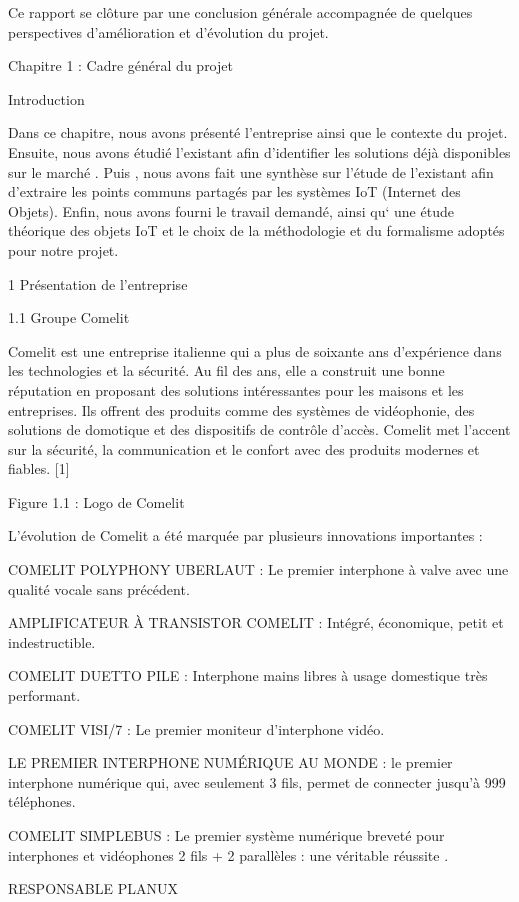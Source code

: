 \documentclass{article}
\begin{document}
Ce rapport se clôture par une conclusion générale accompagnée de quelques perspectives d’amélioration et d’évolution du projet.

Chapitre 1 : Cadre général du projet

Introduction 

Dans ce chapitre, nous avons présenté l'entreprise ainsi que le contexte du projet. Ensuite, nous avons étudié l'existant afin d'identifier les solutions déjà disponibles sur le marché . Puis , nous avons fait une synthèse  sur l’étude de l’existant afin d’extraire les  points  communs  partagés par les systèmes IoT (Internet des Objets). Enfin, nous avons fourni le travail demandé, ainsi qu‘ une  étude théorique des objets IoT et le choix de la méthodologie et du formalisme adoptés pour  notre projet.

1 Présentation de l’entreprise

1.1 Groupe Comelit

Comelit est une entreprise  italienne qui a plus de soixante ans d'expérience dans les technologies et la sécurité. Au fil des ans, elle a construit une bonne réputation en proposant des solutions intéressantes pour les maisons et les entreprises. Ils offrent des produits comme des systèmes de vidéophonie, des solutions de domotique et des dispositifs de contrôle d'accès. Comelit met l'accent sur la sécurité, la communication et le confort avec des produits modernes et fiables. [1]

Figure 1.1 : Logo de Comelit

L’évolution de Comelit a été marquée par plusieurs innovations importantes :

COMELIT POLYPHONY UBERLAUT : Le premier interphone à valve avec une qualité vocale sans précédent. 

AMPLIFICATEUR À TRANSISTOR COMELIT : Intégré, économique, petit et indestructible. 

COMELIT DUETTO PILE : Interphone mains libres à usage domestique très performant. 

COMELIT VISI/7 : Le premier moniteur d'interphone vidéo. 

LE PREMIER INTERPHONE NUMÉRIQUE AU MONDE : le premier interphone numérique qui, avec seulement 3 fils, permet de connecter jusqu’à 999 téléphones. 

COMELIT SIMPLEBUS : Le premier système numérique breveté pour interphones et vidéophones 2 fils + 2 parallèles : une véritable réussite .

RESPONSABLE PLANUX 
\end{document}

